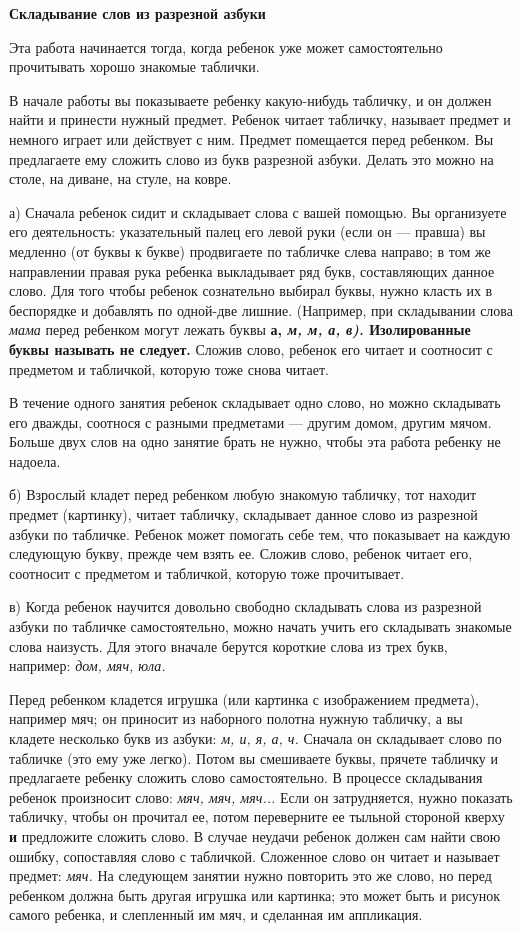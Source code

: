 \documentclass{book}
\renewcommand{\emph}[1]{\textit{#1}}
\begin{document}
\textbf{Складывание слов из разрезной азбуки}

Эта работа начинается тогда, когда ребенок уже может самостоятельно
прочитывать хорошо знакомые таблички.

В начале работы вы показываете ребенку какую-нибудь табличку, и он
должен найти и принести нужный предмет. Ребенок читает табличку,
называет предмет и немного играет или действует с ним. Предмет
помещается перед ребенком. Вы предлагаете ему сложить слово из букв
разрезной азбуки. Делать это можно на столе, на диване, на стуле, на
ковре.

а) Сначала ребенок сидит и складывает слова с вашей помощью. Вы
организуете его деятельность: указательный палец его левой руки (если он
--- правша) вы медленно (от буквы к букве) продвигаете по табличке слева
направо; в том же направлении правая рука ребенка выкладывает ряд букв,
составляющих данное слово. Для того чтобы ребенок сознательно выбирал
буквы, нужно класть их в беспорядке и добавлять по одной-две лишние.
(Например, при складывании слова \emph{мама} перед ребенком могут лежать
буквы \textbf{а, \emph{м, м, а, в).} Изолированные буквы называть не
следует.} Сложив слово, ребенок его читает и соотносит с предметом и
табличкой, которую тоже снова читает.

В течение одного занятия ребенок складывает одно слово, но можно
складывать его дважды, соотнося с разными предметами --- другим домом,
другим мячом. Больше двух слов на одно занятие брать не нужно, чтобы эта
работа ребенку не надоела.

б) Взрослый кладет перед ребенком любую знакомую табличку, тот находит
предмет (картинку), читает табличку, складывает данное слово из
разрезной азбуки по табличке. Ребенок может помогать себе тем, что
показывает на каждую следующую букву, прежде чем взять ее. Сложив слово,
ребенок читает его, соотносит с предметом и табличкой, которую тоже
прочитывает.

в) Когда ребенок научится довольно свободно складывать слова из
разрезной азбуки по табличке самостоятельно, можно начать учить его
складывать знакомые слова наизусть. Для этого вначале берутся короткие
слова из трех букв, например: \emph{дом, мяч, юла.}

Перед ребенком кладется игрушка (или картинка с изображением предмета),
например мяч; он приносит из наборного полотна нужную табличку, а вы
кладете несколько букв из азбуки: \emph{м, и, я, а, ч.} Сначала он
складывает слово по табличке (это ему уже легко). Потом вы смешиваете
буквы, прячете табличку и предлагаете ребенку сложить слово
самостоятельно. В процессе складывания ребенок произносит слово:
\emph{мяч, мяч, мяч...} Если он затрудняется, нужно показать табличку,
чтобы он прочитал ее, потом переверните ее тыльной стороной кверху
\textbf{и} предложите сложить слово. В случае неудачи ребенок должен сам
найти свою ошибку, сопоставляя слово с табличкой. Сложенное слово он
читает и называет предмет: \emph{мяч.} На следующем занятии нужно
повторить это же слово, но перед ребенком должна быть другая игрушка или
картинка; это может быть и рисунок самого ребенка, и слепленный им мяч,
и сделанная им аппликация.
\end{document}
